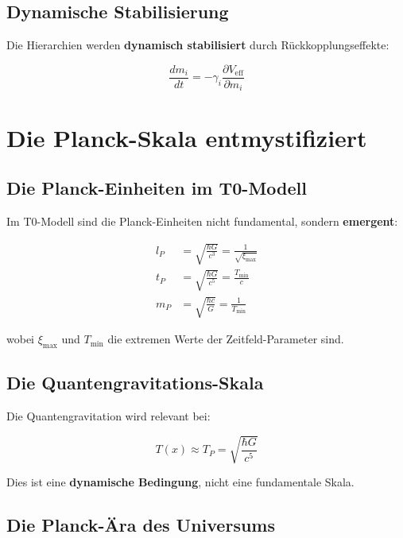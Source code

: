 \documentclass[12pt,a4paper]{report}
\begin{document}
	\subsection{Dynamische Stabilisierung}
	
	Die Hierarchien werden \textbf{dynamisch stabilisiert} durch Rückkopplungseffekte:
	
	\begin{equation}
		\frac{dm_i}{dt} = -\gamma_i \frac{\partial V_{\text{eff}}}{\partial m_i}
	\end{equation}
	
	\section{Die Planck-Skala entmystifiziert}
	
	\subsection{Die Planck-Einheiten im T0-Modell}
	
	Im T0-Modell sind die Planck-Einheiten nicht fundamental, sondern \textbf{emergent}:
	
	\begin{align}
		l_P &= \sqrt{\frac{\hbar G}{c^3}} = \frac{1}{\sqrt{\xi_{\max}}} \\
		t_P &= \sqrt{\frac{\hbar G}{c^5}} = \frac{T_{\min}}{c} \\
		m_P &= \sqrt{\frac{\hbar c}{G}} = \frac{1}{T_{\min}}
	\end{align}
	
	wobei $\xi_{\max}$ und $T_{\min}$ die extremen Werte der Zeitfeld-Parameter sind.
	
	\subsection{Die Quantengravitations-Skala}
	
	Die Quantengravitation wird relevant bei:
	
	\begin{equation}
		T(x) \approx T_P = \sqrt{\frac{\hbar G}{c^5}}
	\end{equation}
	
	Dies ist eine \textbf{dynamische Bedingung}, nicht eine fundamentale Skala.
	
	\subsection{Die Planck-Ära des Universums}
	
\end{document}
